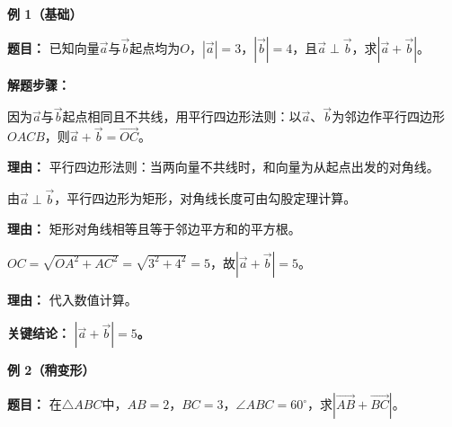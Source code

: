 \begin{examplebox}
	\textbf{\textcolor{CExample}{例 1（基础）}}

	\textbf{\textcolor{CExample}{题目：}}
	已知向量$\vec{a}$与$\vec{b}$起点均为$O$，$|\vec{a}|=3$，$|\vec{b}|=4$，且$\vec{a}\perp\vec{b}$，求$|\vec{a}+\vec{b}|$。

	\textbf{\textcolor{CExample}{解题步骤：}}
	\begin{description}[style=nextline, leftmargin=2.8em, labelsep=0.5em, itemsep=0.45em]
		\item[\textbf{第一步（识别法则）：}] 因为$\vec{a}$与$\vec{b}$起点相同且不共线，用平行四边形法则：以$\vec{a}$、$\vec{b}$为邻边作平行四边形$OACB$，则$\vec{a}+\vec{b}=\overrightarrow{OC}$。
			\par\textbf{理由：}
			平行四边形法则：当两向量不共线时，和向量为从起点出发的对角线。
		\item[\textbf{第二步（利用几何性质）：}] 由$\vec{a}\perp\vec{b}$，平行四边形为矩形，对角线长度可由勾股定理计算。
			\par\textbf{理由：}
			矩形对角线相等且等于邻边平方和的平方根。
		\item[\textbf{第三步（计算模长）：}] $OC=\sqrt{OA^2+AC^2}=\sqrt{3^2+4^2}=5$，故$|\vec{a}+\vec{b}|=5$。
			\par\textbf{理由：}
			代入数值计算。
	\end{description}

	\textbf{\textcolor{CExample}{关键结论：}}
	\textbf{$|\vec{a}+\vec{b}|=5$。}

	\medskip
	\textbf{\textcolor{CExample}{例 2（稍变形）}}

	\textbf{\textcolor{CExample}{题目：}}
	在$\triangle ABC$中，$AB=2$，$BC=3$，$\angle ABC=60^\circ$，求$|\overrightarrow{AB}+\overrightarrow{BC}|$。


\end{examplebox}
